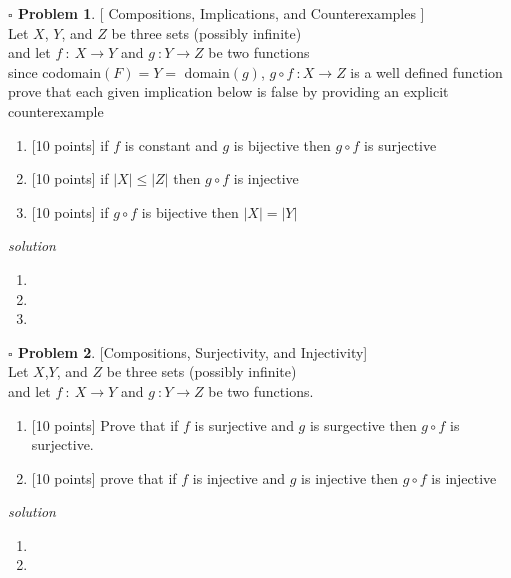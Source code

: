 \documentclass[11pt,twoside]{amsart}
\theoremstyle{definition}
\newtheorem{bprob}{$\square$ Problem}
\begin{document}
\begin{bprob}
  {[ Compositions, Implications, and Counterexamples ]} \\ 
Let $X$, $Y$, and $Z$ be three sets (possibly infinite) \\ 
and let $f \ : \ X \rightarrow Y$ and $g \ : Y \rightarrow Z$ be two functions \\
since codomain$(F) = Y =$ domain$(g)$, $g \circ f \ : X \rightarrow Z$ is a well defined function \\
prove that each given implication below is false by providing an explicit counterexample 
\begin{enumerate}[label= 2.\arabic*, itemsep=0.2cm]
  \item {[10 points]} if $f$ is constant and $g$ is bijective then $g \circ f$ is surjective
  \item {[10 points]} if $|X| \leq |Z|$ then $g \circ f$ is injective
  \item {[10 points]} if $g \circ f$ is bijective then $|X| =|Y|$


\end{enumerate}

\end{bprob}
\emph{solution}

\begin{enumerate}[label= 2.\arabic*), itemsep=0.4cm]
  \item %


  \item %


  \item %


\end{enumerate}

\newpage
\begin{bprob} {[Compositions, Surjectivity, and Injectivity]} \\
  Let $X$,$Y$, and $Z$ be three sets (possibly infinite) \\
  and let $f \ : \ X \rightarrow Y$ and $g \ : Y \rightarrow Z$ be two functions.

  \begin{enumerate}[label= 3.\arabic*, itemsep=0.2cm]
    \item {[10 points]} Prove that if $f$ is surjective and $g$ is surgective then $g \circ f$ is surjective.
    \item {[10 points]} prove that if $f$ is injective and $g$ is injective then $g \circ f$ is injective

  \end{enumerate}
\end{bprob}
\emph{solution}

\begin{enumerate}[label=3.\arabic*, itemsep = 0.4cm]
  \item %

  \item %

\end{enumerate}
	
\end{document}

